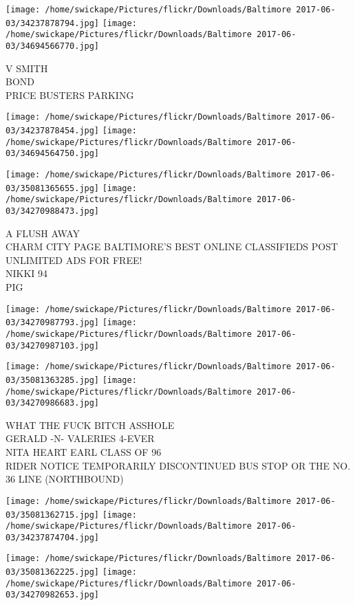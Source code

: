 \documentclass[10pt,letterpaper]{article}
\begin{document}
\vspace{0.25in}
\texttt{[image: /home/swickape/Pictures/flickr/Downloads/Baltimore 2017-06-03/34237878794.jpg]}
\texttt{[image: /home/swickape/Pictures/flickr/Downloads/Baltimore 2017-06-03/34694566770.jpg]}

V SMITH\\
BOND\\
PRICE BUSTERS PARKING\\
\pagebreak

\texttt{[image: /home/swickape/Pictures/flickr/Downloads/Baltimore 2017-06-03/34237878454.jpg]}
\texttt{[image: /home/swickape/Pictures/flickr/Downloads/Baltimore 2017-06-03/34694564750.jpg]}

\texttt{[image: /home/swickape/Pictures/flickr/Downloads/Baltimore 2017-06-03/35081365655.jpg]}
\texttt{[image: /home/swickape/Pictures/flickr/Downloads/Baltimore 2017-06-03/34270988473.jpg]}

A FLUSH AWAY\\
CHARM CITY PAGE BALTIMORE'S BEST ONLINE CLASSIFIEDS POST UNLIMITED ADS FOR FREE!\\
NIKKI 94\\
PIG\\
\pagebreak

\texttt{[image: /home/swickape/Pictures/flickr/Downloads/Baltimore 2017-06-03/34270987793.jpg]}
\texttt{[image: /home/swickape/Pictures/flickr/Downloads/Baltimore 2017-06-03/34270987103.jpg]}

\texttt{[image: /home/swickape/Pictures/flickr/Downloads/Baltimore 2017-06-03/35081363285.jpg]}
\texttt{[image: /home/swickape/Pictures/flickr/Downloads/Baltimore 2017-06-03/34270986683.jpg]}

WHAT THE FUCK BITCH ASSHOLE\\
GERALD {-}N{-} VALERIES 4{-}EVER\\
NITA HEART EARL CLASS OF 96\\
RIDER NOTICE TEMPORARILY DISCONTINUED BUS STOP OR THE NO. 36 LINE (NORTHBOUND)\\
\pagebreak

\texttt{[image: /home/swickape/Pictures/flickr/Downloads/Baltimore 2017-06-03/35081362715.jpg]}
\texttt{[image: /home/swickape/Pictures/flickr/Downloads/Baltimore 2017-06-03/34237874704.jpg]}

\texttt{[image: /home/swickape/Pictures/flickr/Downloads/Baltimore 2017-06-03/35081362225.jpg]}
\texttt{[image: /home/swickape/Pictures/flickr/Downloads/Baltimore 2017-06-03/34270982653.jpg]}
\end{document}
